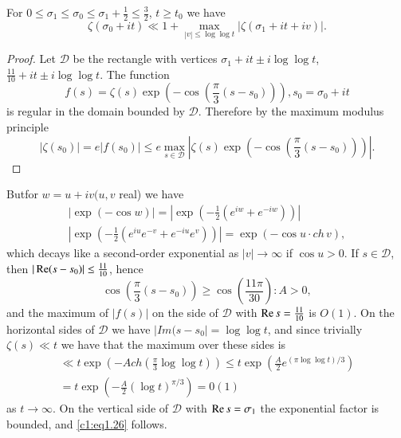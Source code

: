 \begin{thm}\label{c1:thm1.3}
  For $0 \leq \sigma_1 \leq \sigma_0 \leq \sigma_1 + \frac{1}{2} \leq
  \frac{3}{2}$, $t \geq t_0$ we have
  \begin{equation}
   \zeta (\sigma_0 + it ) \ll 1 + \mathop{\max}_{|v|\leq \log
     \log t} |\zeta (\sigma_1 + it + iv)|.\label{c1:eq1.26}
  \end{equation}
\end{thm}

\begin{proof}
  Let $\mathscr{D}$ be the rectangle with vertices $\sigma_1 +
  it  \pm i \log \log t$, $\frac{11}{10} + it  \pm i \log
  \log t$. The function
  $$
  f(s) = \zeta(s) \exp \left(- \cos \left(\frac{\pi}{3} (s - s_0)
  \right)\right), s_0 = \sigma_0 + it  
  $$
  is regular in the domain bounded by $\mathscr{D}$. Therefore by the
  maximum modulus principle
  $$
  |\zeta (s_0)| = e|f (s_0)|\leq e \mathop{\max}_{s \in \mathscr{D}}
  \left|\zeta (s) \exp \left(- \cos \left(\frac{\pi}{3} (s-s_0)
  \right) \right)\right|. 
  $$
\end{proof}

But\pageoriginale for $w= u+ iv (u, v$ real) we have
\begin{gather*}
  |\exp (- \cos w)|= \left|\exp \left(- \frac{1}{2} (e^{iw} + e^{-
    iw})\right)\right| \\
  \left|\exp \left( - \frac{1}{2} (e^{iu}e^{-v} + e^{-iu} e^v)\right)
  \right| = \exp (- \cos u \cdot ch\, v),
\end{gather*}
which decays like a second-order exponential as $|v| \to \infty$ if
$\cos u > 0$. If $s \in  \mathscr{D}$, then $|\operatorname{Re} (s - s_0)| \leq
\frac{11}{10}$, hence 
$$
\cos \left(\frac{\pi}{3} (s- s_0) \right) \geq \cos \left(\frac{11
  \pi}{30} \right): A > 0, 
$$
and the maximum of $|f(s)|$ on the side of $\mathscr{D}$ with $\operatorname{Re} s=
\frac{11}{10}$ is $O (1)$. On the horizontal sides of $\mathscr{D}$ we
have $|Im (s- s_0| = \log \log t$, and since trivially $\zeta (s) \ll
t$ we have that the maximum over these sides is
\begin{multline*}
  \ll t \exp \left(- A ch \left(\frac{\pi}{3} \log \log t \right)
  \right) \leq t \exp \left(\frac{A}{2} e^{(\pi \log \log t)/3}
  \right)\\
  = t \exp \left(- \frac{A}{2} \left(\log t\right)^{\pi/3} \right) = 0(1)
\end{multline*}
as $t \to \infty$. On the vertical side of $\mathscr{D}$ with $\operatorname{Re} s =
\sigma_1$ the exponential factor is bounded, and \eqref{c1:eq1.26}
follows.

